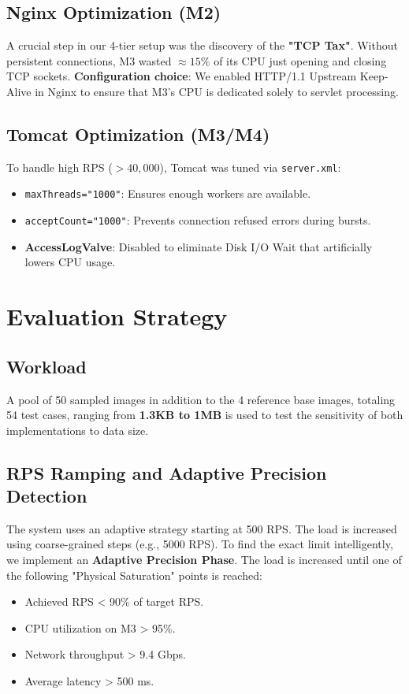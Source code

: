 \documentclass[a4paper,12pt]{article}
\begin{document}
\subsection{Nginx Optimization (M2)}
A crucial step in our 4-tier setup was the discovery of the \textbf{"TCP Tax"}. Without persistent connections, M3 wasted $\approx 15\%$ of its CPU just opening and closing TCP sockets.
\textbf{Configuration choice}: We enabled HTTP/1.1 Upstream Keep-Alive in Nginx to ensure that M3's CPU is dedicated solely to servlet processing.

\subsection{Tomcat Optimization (M3/M4)}
To handle high RPS ($>40,000$), Tomcat was tuned via \texttt{server.xml}:
\begin{itemize}
    \item \texttt{maxThreads="1000"}: Ensures enough workers are available.
    \item \texttt{acceptCount="1000"}: Prevents connection refused errors during bursts.
    \item \textbf{AccessLogValve}: Disabled to eliminate Disk I/O Wait that artificially lowers CPU usage.
\end{itemize}

\newpage
\section{Evaluation Strategy}

\subsection{Workload}
A pool of 50 sampled images in addition to the 4 reference base images, totaling 54 test cases, ranging from \textbf{1.3KB to 1MB} is used to test the sensitivity of both implementations to data size.

\subsection{RPS Ramping and Adaptive Precision Detection}
The system uses an adaptive strategy starting at 500 RPS. The load is increased using coarse-grained steps (e.g., 5000 RPS). To find the exact limit intelligently, we implement an \textbf{Adaptive Precision Phase}. The load is increased until one of the following "Physical Saturation" points is reached:
\begin{itemize}
    \item Achieved RPS < 90\% of target RPS.
    \item CPU utilization on M3 > 95\%.
    \item Network throughput > 9.4 Gbps.
    \item Average latency > 500 ms.
\end{itemize}
\end{document}
